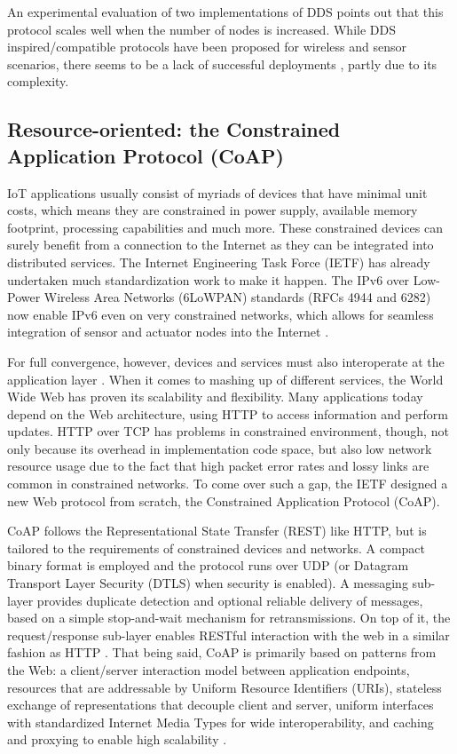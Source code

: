 An experimental evaluation of two implementations of DDS \cite{4536566} points out that this protocol scales well when the number of nodes is increased. While DDS inspired/compatible protocols have been proposed for wireless and sensor scenarios, there seems to be a lack of successful deployments \cite{7396558}, partly due to its complexity. 

\subsection{Resource-oriented: the Constrained Application Protocol (CoAP)}

IoT applications usually consist of myriads of devices that have minimal unit costs, which means they are constrained in power supply, available memory footprint, processing capabilities and much more. These constrained devices can surely benefit from a connection to the Internet as they can be integrated into distributed services. The Internet Engineering Task Force (IETF) has already undertaken much standardization work to make it happen. The IPv6 over Low-Power Wireless Area Networks (6LoWPAN) standards (RFCs 4944 and 6282) now enable IPv6 even on very constrained networks, which allows for seamless integration of sensor and actuator nodes into the Internet \cite{6159216}. 

For full convergence, however, devices and services must also interoperate at the application layer \cite{kovatsch2014californium}. When it comes to mashing up of different services, the World Wide Web has proven its scalability and flexibility. Many applications today depend on the Web architecture, using HTTP to access information and perform updates. HTTP over TCP has problems in constrained environment, though, not only because its overhead in implementation code space, but also low network resource usage due to the fact that high packet error rates and lossy links are common in  constrained networks. To come over such a gap, the IETF designed a new Web protocol from scratch, the Constrained Application Protocol (CoAP). 

CoAP follows the Representational State Transfer (REST) \cite{fielding2000architectural} like HTTP, but is tailored to the requirements of constrained devices and networks. A compact binary format is employed and the protocol runs over UDP (or Datagram Transport Layer Security (DTLS) when security is enabled). A messaging sub-layer provides duplicate detection and optional reliable delivery of messages, based on a simple stop-and-wait mechanism for retransmissions. On top of it, the request/response sub-layer enables RESTful interaction with the web in a similar fashion as HTTP \cite{kovatsch2014californium}. That being said, CoAP is primarily based on patterns from the Web: a client/server interaction model between application endpoints, resources that are addressable by Uniform Resource Identifiers (URIs), stateless exchange of representations that decouple client and server, uniform interfaces with standardized Internet Media Types for wide interoperability, and caching and proxying to enable high scalability \cite{kovatsch2015scalable}. 

